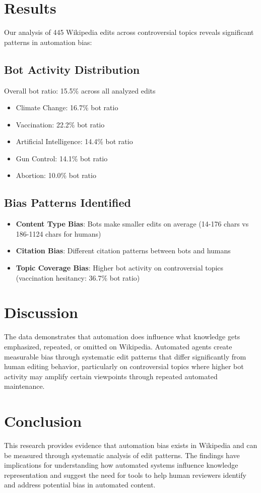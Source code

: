 \documentclass[11pt]{article}
\begin{document}
\section{Results}

Our analysis of 445 Wikipedia edits across controversial topics reveals significant patterns in automation bias:

\subsection{Bot Activity Distribution}
Overall bot ratio: 15.5\% across all analyzed edits
\begin{itemize}
\item Climate Change: 16.7\% bot ratio
\item Vaccination: 22.2\% bot ratio  
\item Artificial Intelligence: 14.4\% bot ratio
\item Gun Control: 14.1\% bot ratio
\item Abortion: 10.0\% bot ratio
\end{itemize}

\subsection{Bias Patterns Identified}
\begin{itemize}
\item \textbf{Content Type Bias}: Bots make smaller edits on average (14-176 chars vs 186-1124 chars for humans)
\item \textbf{Citation Bias}: Different citation patterns between bots and humans
\item \textbf{Topic Coverage Bias}: Higher bot activity on controversial topics (vaccination hesitancy: 36.7\% bot ratio)
\end{itemize}

\section{Discussion}

The data demonstrates that automation does influence what knowledge gets emphasized, repeated, or omitted on Wikipedia. Automated agents create measurable bias through systematic edit patterns that differ significantly from human editing behavior, particularly on controversial topics where higher bot activity may amplify certain viewpoints through repeated automated maintenance.

\section{Conclusion}

This research provides evidence that automation bias exists in Wikipedia and can be measured through systematic analysis of edit patterns. The findings have implications for understanding how automated systems influence knowledge representation and suggest the need for tools to help human reviewers identify and address potential bias in automated content.



\end{document}
